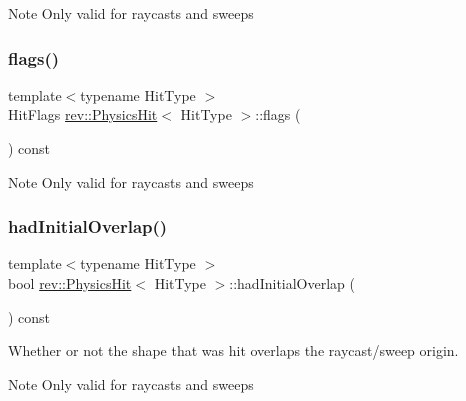 \begin{DoxyNote}{Note}
Only valid for raycasts and sweeps 
\end{DoxyNote}
\mbox{\label{classrev_1_1_physics_hit_a566ec817e8cc196b3c90436a26c92b65}} 
\subsubsection{\texorpdfstring{flags()}{flags()}}
{\footnotesize\ttfamily template$<$typename Hit\+Type $>$ \\
Hit\+Flags \mbox{\hyperlink{classrev_1_1_physics_hit}{rev\+::\+Physics\+Hit}}$<$ Hit\+Type $>$\+::flags (\begin{DoxyParamCaption}{ }\end{DoxyParamCaption}) const\hspace{0.3cm}{\ttfamily [inline]}}

\begin{DoxyNote}{Note}
Only valid for raycasts and sweeps 
\end{DoxyNote}
\mbox{\label{classrev_1_1_physics_hit_a35a730fac78b7f3ced9731ce4ca77f67}} 
\subsubsection{\texorpdfstring{hadInitialOverlap()}{hadInitialOverlap()}}
{\footnotesize\ttfamily template$<$typename Hit\+Type $>$ \\
bool \mbox{\hyperlink{classrev_1_1_physics_hit}{rev\+::\+Physics\+Hit}}$<$ Hit\+Type $>$\+::had\+Initial\+Overlap (\begin{DoxyParamCaption}{ }\end{DoxyParamCaption}) const\hspace{0.3cm}{\ttfamily [inline]}}



Whether or not the shape that was hit overlaps the raycast/sweep origin. 

\begin{DoxyNote}{Note}
Only valid for raycasts and sweeps 
\end{DoxyNote}
\mbox{\label{classrev_1_1_physics_hit_a9c2fccb821c7e4e2e2bb42527e23e781}} 
